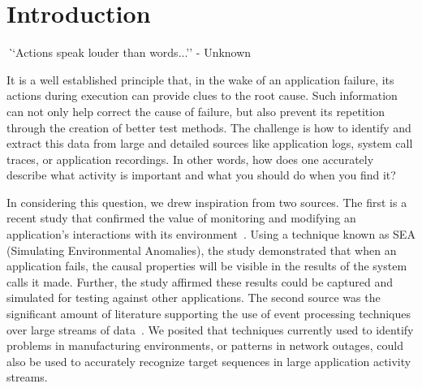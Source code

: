 \section{Introduction}
\label{sec:introduction}


{\textit ``Actions speak louder than words...'' - Unknown}


It is a well established principle
that, in the wake of an application failure,
its actions
during execution can provide clues
to the root cause.
Such information
can not only help correct
the cause of failure,
but also prevent its repetition through the creation
of better test methods.
The challenge is 
how to identify and extract this data
from large and detailed sources like application logs,
system call traces,
or application recordings.
In other words, how does one
accurately describe what activity is important
and what you should do when you find it?

In considering this question,  we drew inspiration from two sources. The
first is a recent study that confirmed the value of monitoring and
modifying an application’s  interactions with its environment~\cite{DBLP:conf/issre/MooreCFW19}.  Using a technique known as SEA (Simulating Environmental Anomalies), the study demonstrated that when an application fails, the causal properties
will be visible in the results of the system calls it made. Further, the study affirmed these results could
be captured and simulated for testing against other applications.  The
second source was the significant amount of literature supporting the use of event
processing techniques over large streams of data~\cite{DBLP:conf/sigmod/AgrawalDGI08,DBLP:conf/debs/Hirzel12,DBLP:journals/ibmrd/HirzelAGJKKMNSSW13,DBLP:journals/csur/DayarathnaP18}. We posited that techniques
currently used to identify problems in  manufacturing environments, or patterns in
network outages, could also be used to accurately recognize target
sequences in large
application activity streams.

